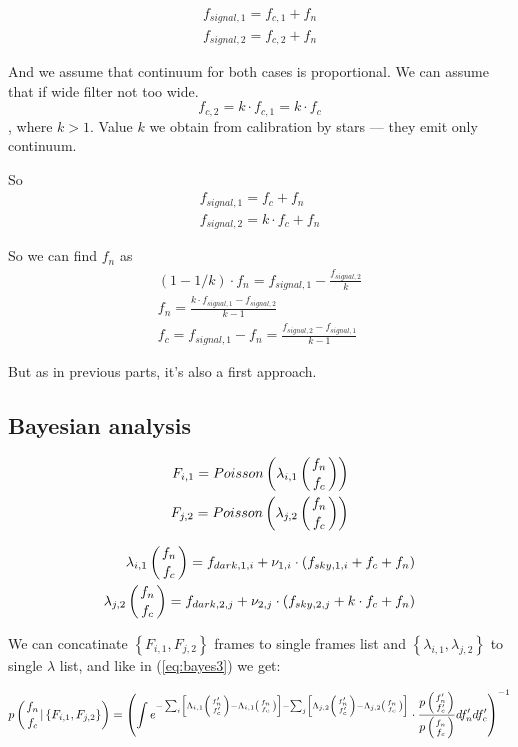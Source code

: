 \documentclass{article}
\begin{document}
\begin{eqnarray}
    f_{signal, 1} = f_{c, 1} + f_{n} \\
    f_{signal, 2} = f_{c, 2} + f_{n}
\end{eqnarray}

And we assume that continuum for both cases is proportional. We can assume that if wide filter not too wide.
\begin{equation}
    f_{c,2} = k \cdot f_{c,1} = k \cdot f_c
\end{equation}, where $k > 1$. Value $k$ we obtain from calibration by stars --- they emit only continuum.

So
\begin{eqnarray}
    f_{signal, 1} = f_c + f_n \\
    f_{signal, 2} = k \cdot f_c + f_n
\end{eqnarray}

So we can find $f_n$ as
\begin{eqnarray}
    (1-1/k) \cdot f_n = f_{signal, 1} - \frac{f_{signal, 2}}{k} \\
    f_n = \frac{k \cdot f_{signal, 1} - f_{signal, 2}}{k-1} \\
    f_c = f_{signal,1} - f_n = \frac{f_{signal, 2} - f_{signal, 1}}{k-1}
\end{eqnarray}

But as in previous parts, it's also a first approach.

\subsection{Bayesian analysis}

\begin{eqnarray}
    F_{i,1} = Poisson\left( \lambda_{i,1}\left({f_n \atop f_c}\right) \right) \\
    F_{j,2} = Poisson\left( \lambda_{j,2}\left({f_n \atop f_c}\right) \right)
\end{eqnarray}

\begin{eqnarray}
    \lambda_{i,1}\left({f_n \atop f_c}\right) = f_{dark, 1, i} + \nu_{1,i} \cdot \left( f_{sky, 1, i} + f_c + f_n \right) \\
    \lambda_{j,2}\left({f_n \atop f_c}\right) = f_{dark, 2, j} + \nu_{2,j} \cdot \left( f_{sky, 2, j} + k \cdot f_c + f_n \right)
\end{eqnarray}

We can concatinate $\left\{F_{i,1}, F_{j,2}\right\}$ frames to single frames list and
$\left\{ \lambda_{i,1}, \lambda_{j,2} \right\}$ to single $\lambda$ list, and like in (\ref{eq:bayes3}) we get:

\begin{eqnarray}
p\left({f_n \atop f_c} | \left\{ F_{i,1}, F_{j,2} \right\}\right) =
\left( \int e^{
    -\sum_i \left[\Lambda_{i,1}\left({f'_n \atop f'_c}\right) - \Lambda_{i,1}\left({f_n \atop f_c}\right) \right]
    -\sum_j \left[\Lambda_{j,2}\left({f'_n \atop f'_c}\right) - \Lambda_{j,2}\left({f_n \atop f_c}\right) \right]}
\cdot \frac{p\left({f'_n \atop f'_c}\right)}{p\left({f_n \atop f_c}\right)} df'_n df'_c \right)^{-1}
\end{eqnarray}
\end{document}
